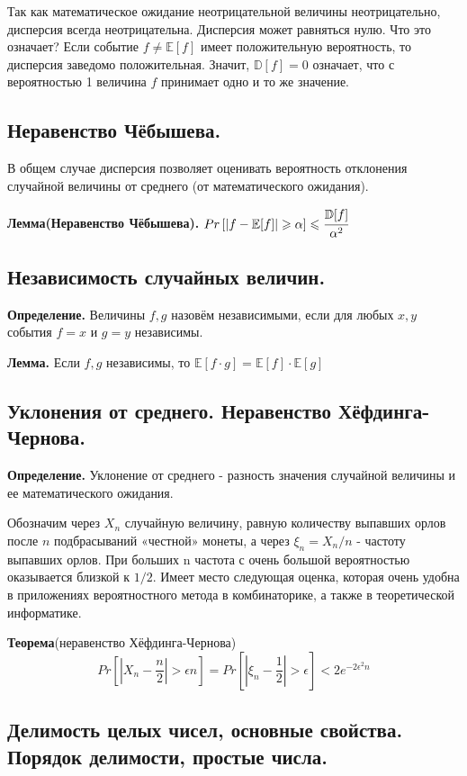 \documentclass[a4paper, 10pt]{article}
\begin{document}
Так как математическое ожидание неотрицательной величины неотрицательно, дисперсия всегда неотрицательна. Дисперсия может равняться нулю. Что это означает? Если событие $f \neq \mathbb{E}[f]$ имеет положительную вероятность, то дисперсия заведомо положительная. Значит, $\mathbb{D}[f] = 0$ означает, что с вероятностью 1 величина $f$ принимает одно и то же значение.

\subsection{Неравенство Чёбышева.}

В общем случае дисперсия позволяет оценивать вероятность отклонения случайной величины от среднего (от математического ожидания).

\textbf{Лемма(Неравенство Чёбышева).} $Pr \left [|f - \mathbb{E}[f]| \geqslant \alpha \right] \leqslant \cfrac{\mathbb{D}[f]}{\alpha^2}$

\subsection{Независимость случайных величин.}

\textbf{Определение.} Величины $f, g$ назовём независимыми, если для любых $x, y$ события $f = x$ и $g = y$ независимы.

\textbf{Лемма.} Если $f, g$ независимы, то $\mathbb{E}[f \cdot g] = \mathbb{E}[f] \cdot \mathbb{E}[g]$

\subsection{Уклонения от среднего. Неравенство Хёфдинга-Чернова.}

\textbf{Определение.} Уклонение от среднего - разность значения случайной величины и ее математического ожидания.

Обозначим через $X_n$ случайную величину, равную количеству выпавших орлов после $n$ подбрасываний «честной» монеты, а через $\xi_n = X_n/n$ - частоту выпавших орлов. При больших n частота с очень большой вероятностью оказывается близкой к $1/2$. Имеет место следующая оценка, которая очень удобна в приложениях вероятностного метода в комбинаторике, а также в теоретической информатике.

\textbf{Теорема}(неравенство Хёфдинга-Чернова) $$Pr[|X_n - \frac{n}{2}| >  \epsilon n] = Pr[|\xi_n - \frac{1}{2}| > \epsilon] < 2e^{-2\epsilon^{2}n}$$

\subsection{Делимость целых чисел, основные свойства. Порядок делимости, простые числа.}
\end{document}
